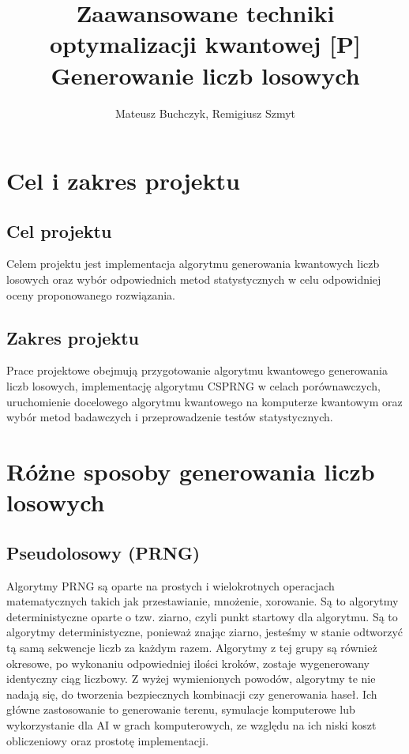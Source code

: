 \documentclass{article}
\title{Zaawansowane techniki optymalizacji kwantowej [P] \\
\vspace{0.3cm}
\large Generowanie liczb losowych}
\author{Mateusz Buchczyk, Remigiusz Szmyt}
\begin{document}
\maketitle
\newpage
\section{Cel i zakres projektu}
\subsection{Cel projektu}
Celem projektu jest implementacja algorytmu generowania kwantowych liczb losowych oraz wybór odpowiednich metod statystycznych w celu odpowidniej oceny proponowanego rozwiązania.
\subsection{Zakres projektu}
Prace projektowe obejmują przygotowanie algorytmu kwantowego generowania liczb losowych, implementację algorytmu CSPRNG w celach porównawczych, uruchomienie docelowego algorytmu kwantowego na komputerze kwantowym oraz wybór metod badawczych i przeprowadzenie testów statystycznych.
\section{Różne sposoby generowania liczb losowych}
\subsection{Pseudolosowy (PRNG)}
Algorytmy PRNG są oparte na prostych i wielokrotnych operacjach matematycznych takich jak przestawianie, mnożenie, xorowanie. Są to algorytmy deterministyczne oparte o tzw. ziarno, czyli punkt startowy dla algorytmu.
Są to algorytmy deterministyczne, ponieważ znając ziarno, jesteśmy w stanie odtworzyć tą samą sekwencje liczb za każdym razem. Algorytmy z tej grupy są również okresowe, po wykonaniu odpowiedniej ilości kroków, zostaje wygenerowany
identyczny ciąg liczbowy. Z wyżej wymienionych powodów, algorytmy te nie nadają się,
do tworzenia bezpiecznych kombinacji czy generowania haseł. Ich główne zastosowanie to generowanie terenu, symulacje komputerowe lub wykorzystanie dla AI w grach komputerowych, ze względu na ich niski koszt obliczeniowy oraz
prostotę implementacji.
\end{document}
